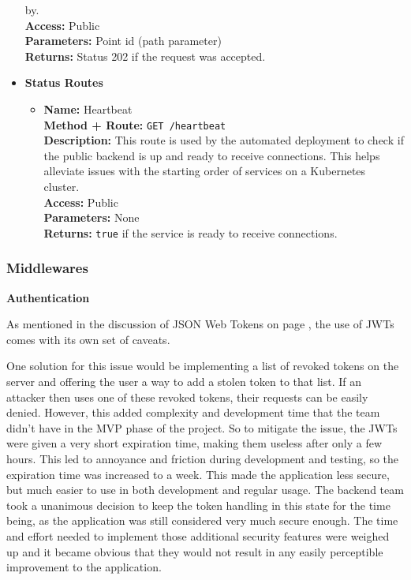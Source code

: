 \begin{itemize}
{\begin{itemize}
{        by.\\
        \textbf{Access:} Public\\
        \textbf{Parameters:} Point id (path parameter)\\
        \textbf{Returns:} Status 202 if the request was accepted.\\
      }
    \end{itemize}
  }
  \item{
    \textbf{Status Routes}
    \begin{itemize}
      \item {
        \textbf{Name:} Heartbeat\\
        \textbf{Method + Route:} \texttt{GET /heartbeat}\\
        \textbf{Description:} This route is used by the automated deployment to
        check if the public backend is up and ready to receive connections. This
        helps alleviate issues with the starting order of services on a
        Kubernetes cluster.\\
        \textbf{Access:} Public\\
        \textbf{Parameters:} None\\
        \textbf{Returns:} \texttt{true} if the service is ready to receive connections.\\
      }
    \end{itemize}
  }
\end{itemize}

\subsubsection{Middlewares}\label{backend_middlewares}
\textbf{Authentication}


As mentioned in the discussion of JSON Web Tokens on page \pageref{jwt}, the use of JWTs comes
with its own set of caveats.

One solution for this issue would be implementing a list of revoked tokens on
the server and offering the user a way to add a stolen token to that list. If an
attacker then uses one of these revoked tokens, their requests can be easily
denied. However, this added complexity and development time that the team didn't
have in the MVP phase of the project. So to mitigate the issue, the JWTs were
given a very short expiration time, making them useless after only a few hours.
This led to annoyance and friction during development and testing, so the
expiration time was increased to a week. This made the application less secure,
but much easier to use in both development and regular usage. The backend team
took a unanimous decision to keep the token handling in this state for the time
being, as the application was still considered very much secure enough. The time
and effort needed to implement those additional security features were weighed
up and it became obvious that they would not result in any easily perceptible
improvement to the application.

